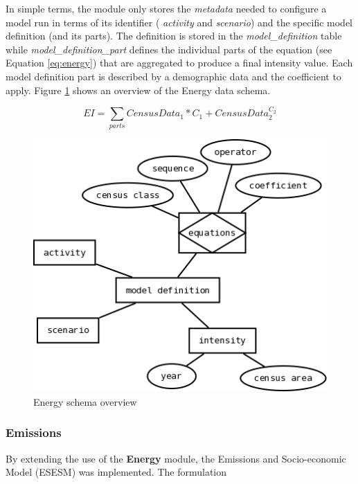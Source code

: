 In simple terms, the module only stores the \textit{metadata} needed to configure a model run in terms of its identifier ( \textit{activity} and \textit{scenario}) and the specific model definition (and its parts). The definition is stored in the \textit{model\_definition} table while \textit{model\_definition\_part} defines the individual parts of the equation (see Equation \ref{eq:energy}) that are aggregated to produce a final intensity
value. Each model definition part is described by a demographic data and the coefficient to apply. Figure \ref{fig:energy_diag} shows an overview of the Energy data schema.

\begin{equation}
\label{eq:energy}
EI=\sum_{parts}{CensusData_1*C_1+CensusData_2^{C_2}}
\end{equation}


\begin{figure}
	\caption{Energy schema overview}
	\label{fig:energy_diag}
	\includegraphics[width = 12cm]{energy.png}
\end{figure}

\subsubsection*{Emissions}
By extending the use of the \textbf{Energy} module, the Emissions and Socio-economic Model (ESESM) was implemented. The formulation
